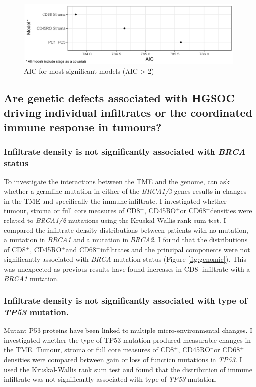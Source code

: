 \begin{figure}
     \centering
     \includegraphics{AIC}
     \caption{AIC for most significant models (AIC > 2)}
     \label{fig:AIC}
 \end{figure}


\subsection{Are genetic defects associated with HGSOC driving individual infiltrates or the coordinated immune response in tumours?}

\subsubsection*{Infiltrate density is not significantly associated with \textit{BRCA} status}
To investigate the interactions between the TME and the genome, can ask whether a germline mutation in either of the \textit{BRCA1/2} genes results in changes in the TME and specifically the immune infiltrate. I investigated whether tumour, stroma or full core measures of CD8$^+$, CD45RO$^+$or CD68$^+$densities were related to \textit{BRCA1/2} mutations using the Kruskal-Wallis rank sum test. I compared the infiltrate density distributions between patients with no mutation, a mutation in \textit{BRCA1} and a mutation in \textit{BRCA2}. I found that the distributions of CD8$^+$, CD45RO$^+$and CD68$^+$infiltrates and the principal components were not significantly associated with \textit{BRCA} mutation status (Figure \ref{fig:genomic}). This was unexpected as previous results have found increases in CD8$^+$infiltrate with a \textit{BRCA1} mutation\cite{Clarke2009}.

\subsubsection{Infiltrate density is not significantly associated with type of \textit{TP53} mutation.}
Mutant P53 proteins have been linked to multiple micro-environmental changes\cite{Cordani2016}. I investigated whether the type of TP53 mutation produced measurable changes in the TME. Tumour, stroma or full core measures of CD8$^+$, CD45RO$^+$or CD68$^+$densities were compared between gain or loss of function mutations in \textit{TP53}. I used the Kruskal-Wallis rank sum test and found that the distribution of immune infiltrate was not significantly associated with type of \textit{TP53} mutation.

